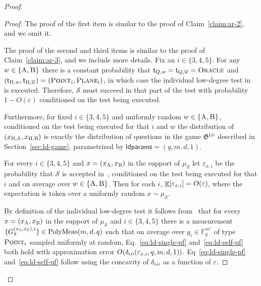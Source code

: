 \documentclass[11pt]{article}
\theoremstyle{definition}
\newcommand{\ol}[1]{\overline{#1}}
\newcommand{\F}{\ensuremath{\mathbb{F}}}
\newcommand{\ld}{\textsc{ld}}
\newcommand{\eps}{\varepsilon}
\newcommand{\E}{\mathop{\mathbb{E}}\displaylimits} %
\newcommand{\game}{\mathfrak{G}}
\newcommand{\sampler}{\mathcal{S}}
\newcommand{\strategy}{\mathscr{S}}
\newcommand{\labelstyle}[1]{\ensuremath{\textsc{#1}}\xspace}
\newcommand{\tvarstyle}[1]{\mathsf{#1}}
\newcommand{\tvar}{\ensuremath{\tvarstyle{t}}}
\newcommand{\alice}{\labelstyle{A}}
\newcommand{\bob}{\labelstyle{B}}
\newcommand{\oracle}{\labelstyle{Oracle}}
\newcommand{\typestyle}[1]{\ensuremath{\textsc{#1}}\xspace}
\newcommand{\Plane}{\typestyle{Plane}}
\newcommand{\Point}{\typestyle{Point}}
\newcommand{\ldparams}{\mathsf{ldparams}}
\newcommand{\polymeas}[3]{\mathrm{PolyMeas}(#1,#2,#3)}
\begin{document}
\begin{proof}
	\begin{proof} 
    The proof of the first item is similar to the proof of
    Claim~\ref{claim:ar-2}, and we omit it.

    The proof of the second and third items is similar to the proof of
    Claim~\ref{claim:ar-3}, and we include more details.
    Fix an $i\in\{3,4,5\}$.
    For any $w\in\{\alice,\bob\}$ there is a constant probability that
    $\tvar_{Q,w} = \tvar_{Q,\ol{w}} = \oracle$ and $(\tvar_{\Pi,w}, \tvar_{\Pi,
      \ol{w}}) = (\Point_i, \Plane_i)$, in which case the individual low-degree
    test in~ is executed.
    Therefore, $\strategy$ must succeed in that part of the test with
    probability $1-O(\eps)$ conditioned on the test being executed.
					
    Furthermore, for fixed $i\in \{3,4,5\}$ and uniformly random
    $w\in\{\alice,\bob\}$, conditioned on the test being executed for that $i$
    and $w$ the distribution of $(x_{\Pi,\alice},x_{\Pi,\bob})$ is exactly the
    distribution of questions in the game $\game^\ld$ described in
    Section~\ref{sec:ld-game}, parametrized by $\ldparams = (q, m, d, 1)$.
			
    For every $i\in\{3,4,5\}$ and $x=(x_\alice,x_\bob)$ in the support of
    $\mu_\sampler$ let $\eps_{x,i}$ be the probability that $\strategy$ is
    accepted in~, conditioned on the test being
    executed for that $i$ and on average over $w\in\{\alice,\bob\}$.
    Then for each $i$, $\E[\eps_{x,i}] = O(\eps)$, where the expectation is
    taken over a uniformly random $x\sim \mu_\sampler$.

    By definition of the individual low-degree test it follows
    from~ that for every $x=(x_\alice,x_\bob)$ in the
    support of $\mu_\sampler$ and $i\in\{3,4,5\}$ there is a measurement
    $\{G^{({x}_\alice, {x}_\bob), i}_{g}\} \in \polymeas{m}{d}{q}$ such that on
    average over $y_i\in \F_q^{m'}$ of type $\Point_i$ sampled uniformly at
    random, Eq.~\eqref{eq:ld-single-pf} and~\eqref{eq:ld-self-pf} both hold with
    approximation error $O(\delta_{\ld}(\eps_{x,i},q,m,d,1))$.
    Eq~\eqref{eq:ld-single-pf} and~\eqref{eq:ld-self-pf} follow using the concavity
    of $\delta_{\ld}$ as a function of $\eps$.


\end{proof}
\end{proof}
\end{document}

